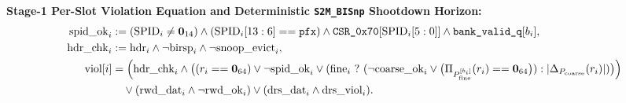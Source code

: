 \documentclass[10pt,twocolumn]{article}
\theoremstyle{spectralthm}
\begin{document}
\noindent\textbf{Stage-1 Per-Slot Violation Equation and Deterministic \texttt{S2M\_BISnp} Shootdown Horizon:}
\begin{equation}
\label{eq:viol_full}
\begin{aligned}
\mathrm{spid\_ok}_i &:= (\mathrm{SPID}_i \neq \mathbf{0}_{14}) \wedge (\mathrm{SPID}_i[13:6] == \texttt{pfx})
\wedge \texttt{CSR\_0x70}[\mathrm{SPID}_i[5:0]] \wedge \texttt{bank\_valid\_q}[b_i],\\
\mathrm{hdr\_chk}_i &:= \mathrm{hdr}_i \wedge \neg\mathrm{birsp}_i \wedge \neg\mathrm{snoop\_evict}_i,\\
\mathrm{viol}[i] &= \Bigl(\mathrm{hdr\_chk}_i \wedge \bigl((r_i == \mathbf{0}_{64}) \vee \neg\mathrm{spid\_ok}_i
\vee (\mathrm{fine}_i \ ? \ (\neg\mathrm{coarse\_ok}_i \vee \bigl(\Pi_{P_{\mathrm{fine}}^{[b_i]}}(r_i) == \mathbf{0}_{64}\bigr)) : |\Delta_{P_{\mathrm{coarse}}}(r_i)|)\bigr)\Bigr)\\
&\quad\vee (\mathrm{rwd\_dat}_i \wedge \neg\mathrm{rwd\_ok}_i) \vee (\mathrm{drs\_dat}_i \wedge \mathrm{drs\_viol}_i).
\end{aligned}
\end{equation}
\end{document}
